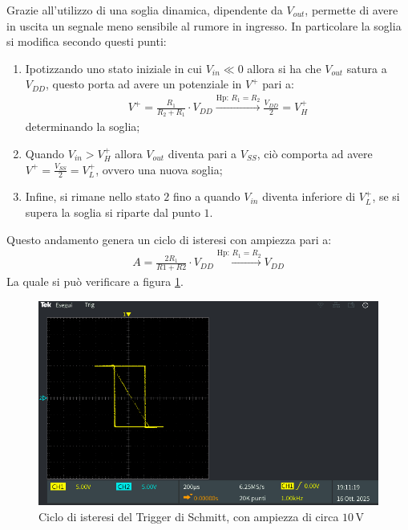 \documentclass[a4paper,12pt]{article}
\begin{document}
Grazie all'utilizzo di una soglia dinamica, dipendente da $V_{out}$, permette di avere in uscita un segnale meno sensibile al rumore in ingresso. In particolare la soglia si modifica secondo questi punti:
\begin{enumerate}
	\item Ipotizzando uno stato iniziale in cui $V_{in} \ll 0$ allora si ha che $V_{out}$ satura a $V_{DD}$, questo porta ad avere un potenziale in $V^+$ pari a:
	      \begin{align*}
		      V^+ = \frac{R_1}{R_2 + R_1} \cdot V_{DD} \xrightarrow{\mathrm{Hp:}\,R_1 = R_2} \frac{V_{DD}}{2} = V^+_H
	      \end{align*}
	      determinando la soglia;
	\item Quando $V_{in} > V^+_H$ allora $V_{out}$ diventa pari a $V_{SS}$, ciò comporta ad avere $V^+ = \frac{V_{SS}}{2} = V^+_L$, ovvero una nuova soglia;
	\item Infine, si rimane nello stato $2$ fino a quando $V_{in}$ diventa inferiore di $V^+_L$, se si supera la soglia si riparte dal punto $1$.
\end{enumerate}
Questo andamento genera un ciclo di isteresi con ampiezza pari a:
\begin{align*}
	A =\frac{2R_1}{R1+R2} \cdot V_{DD} \xrightarrow{\mathrm{Hp:}\,R_1 = R_2} V_{DD}
\end{align*}
La quale si può verificare a figura \ref{fig:schmitt_mod_xy}.

\begin{figure}[h]
	\centering
	\includegraphics[width = 0.8\linewidth]{immagini/schmitt/schmitt_vin_vout_xy.png}
	\caption{Ciclo di isteresi del Trigger di Schmitt, con ampiezza di circa $10\,\mathrm{V}$}
	\label{fig:schmitt_mod_xy}
\end{figure}
\end{document}
